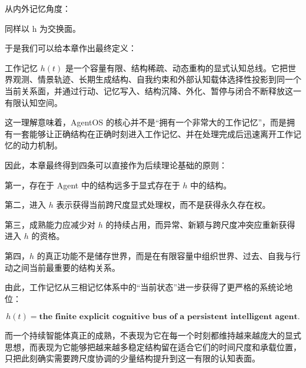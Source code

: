 从内外记忆角度：
\begin{statementbox}
\centering
{}
\end{statementbox}
同样以 h 为交换面。

于是我们可以给本章作出最终定义：

\begin{definition*}
工作记忆 $h(t)$ 是一个容量有限、结构稀疏、动态重构的显式认知总线。它把世界观测、情景轨迹、长期生成结构、自我约束和外部认知载体选择性投影到同一个当前关系面，并通过行动、记忆写入、结构沉降、外化、暂停与闭合不断释放这一有限认知空间。
\end{definition*}

这一理解意味着，AgentOS 的核心并不是“拥有一个非常大的工作记忆”，而是拥有一套能够让正确结构在正确时刻进入工作记忆、并在处理完成后迅速离开工作记忆的动力机制。

因此，本章最终得到四条可以直接作为后续理论基础的原则：

\begin{proposition*}
第一，存在于 Agent 中的结构远多于显式存在于 $h$ 中的结构。
\end{proposition*}

\begin{statementbox}
第二，进入 $h$ 表示获得当前跨尺度显式处理权，而不是获得永久存在权。
\end{statementbox}

\begin{statementbox}
第三，成熟能力应减少对 $h$ 的持续占用，而异常、新颖与跨尺度冲突应重新获得进入 $h$ 的资格。
\end{statementbox}

\begin{statementbox}
第四，$h$ 的真正功能不是储存世界，而是在有限容量中组织世界、过去、自我与行动之间当前最重要的结构关系。
\end{statementbox}

由此，工作记忆从三相记忆体系中的“当前状态”进一步获得了更严格的系统论地位：

\[
\boxed{
h(t)
=
\textbf{the finite explicit cognitive bus of a persistent intelligent agent}.
}
\]

而一个持续智能体真正的成熟，不表现为它在每一个时刻都维持越来越庞大的显式思想，而表现为它能够把越来越多稳定结构留在适合它们的时间尺度和承载位置，只把此刻确实需要跨尺度协调的少量结构提升到这一有限的认知表面。
